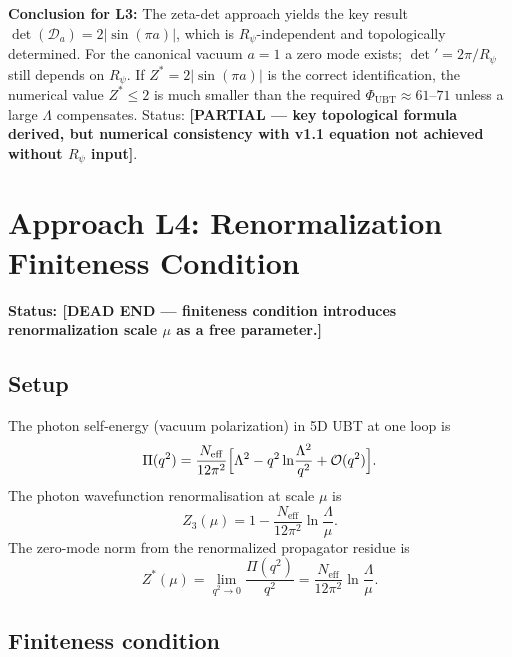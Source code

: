 \documentclass[11pt,a4paper]{article}
\theoremstyle{definition}
\theoremstyle{remark}
\begin{document}
\textbf{Conclusion for L3:}
The zeta-det approach yields the key result $\det(\mathcal{D}_a) = 2|\sin(\pi a)|$,
which is $R_\psi$-independent and topologically determined.
For the canonical vacuum $a=1$ a zero mode exists; $\det' = 2\pi/R_\psi$
still depends on $R_\psi$.
If $Z^* = 2|\sin(\pi a)|$ is the correct identification, the numerical
value $Z^* \leq 2$ is much smaller than the required $\Phi_{\mathrm{UBT}}\approx
61$--$71$ unless a large $\Lambda$ compensates.
Status: \textbf{[PARTIAL — key topological formula derived,
but numerical consistency with v1.1 equation not achieved without $R_\psi$ input]}.

\section{Approach L4: Renormalization Finiteness Condition}
\label{sec:L4_renorm}

\textbf{Status: [DEAD END — finiteness condition introduces renormalization
scale $\mu$ as a free parameter.]}

\subsection{Setup}

The photon self-energy (vacuum polarization) in 5D UBT at one loop is
\begin{equation}
  \Pi(q^2)
  = \frac{N_{\mathrm{eff}}}{12\pi^2}
    \Bigl[\Lambda^2 - q^2\ln\!\frac{\Lambda^2}{q^2} + \mathcal{O}(q^2)\Bigr].
  \label{eq:Pi_oneloop}
\end{equation}
The photon wavefunction renormalisation at scale $\mu$ is
\begin{equation}
  Z_3(\mu)
  = 1 - \frac{N_{\mathrm{eff}}}{12\pi^2}\ln\!\frac{\Lambda}{\mu}.
  \label{eq:Z3}
\end{equation}
The zero-mode norm from the renormalized propagator residue is
\begin{equation}
  Z^*(\mu)
  = \lim_{q^2\to 0}\frac{\Pi(q^2)}{q^2}
  = \frac{N_{\mathrm{eff}}}{12\pi^2}\ln\!\frac{\Lambda}{\mu}.
  \label{eq:Z_star_renorm}
\end{equation}

\subsection{Finiteness condition}
\end{document}
